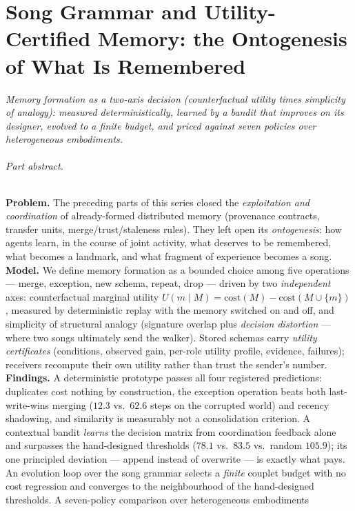 \documentclass{article}
\begin{document}
\clearpage
\part{Song Grammar and Utility-Certified Memory: the Ontogenesis of What Is Remembered}
\noindent\textit{Memory formation as a two-axis decision (counterfactual utility times simplicity of analogy): measured deterministically, learned by a bandit that improves on its designer, evolved to a finite budget, and priced against seven policies over heterogeneous embodiments.}

\paragraph{Part abstract.} \textbf{Problem.} The preceding parts of this series closed the
\emph{exploitation and coordination} of already-formed distributed
memory (provenance contracts, transfer units, merge/trust/staleness
rules). They left open its \emph{ontogenesis}: how agents learn, in
the course of joint activity, what deserves to be remembered, what
becomes a landmark, and what fragment of experience becomes a song.
\textbf{Model.} We define memory formation as a bounded choice among
five operations --- merge, exception, new schema, repeat, drop ---
driven by two \emph{independent} axes: counterfactual marginal
utility $U(m \mid M) = \mathrm{cost}(M) - \mathrm{cost}(M \cup
\{m\})$, measured by deterministic replay with the memory switched
on and off, and simplicity of structural analogy (signature overlap
plus \emph{decision distortion} --- where two songs ultimately send
the walker). Stored schemas carry \emph{utility certificates}
(conditions, observed gain, per-role utility profile, evidence,
failures); receivers recompute their own utility rather than trust
the sender's number.
\textbf{Findings.} A deterministic prototype passes all four
registered predictions: duplicates cost nothing by construction, the
exception operation beats both last-write-wins merging ($12.3$ vs.\
$62.6$ steps on the corrupted world) and recency shadowing, and
similarity is measurably not a consolidation criterion. A contextual
bandit \emph{learns} the decision matrix from coordination feedback
alone and surpasses the hand-designed thresholds ($78.1$ vs.\ $83.5$
vs.\ random $105.9$); its one principled deviation --- append instead
of overwrite --- is exactly what pays. An evolution loop over the
song grammar selects a \emph{finite} couplet budget with no cost
regression and converges to the neighbourhood of the hand-designed
thresholds. A seven-policy comparison over heterogeneous embodiments
\end{document}
